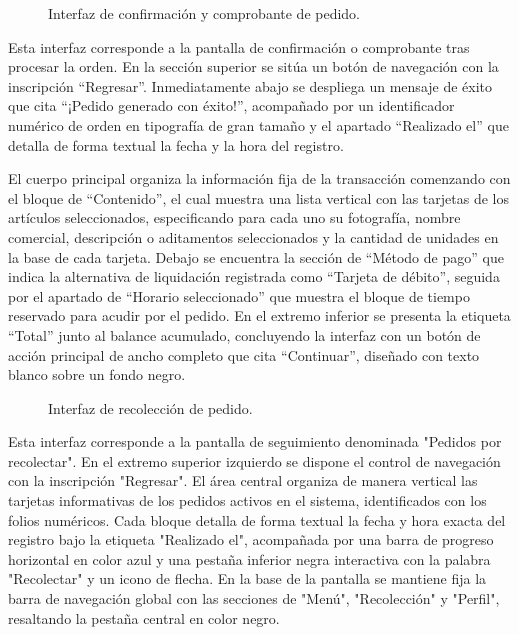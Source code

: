 \begin{figure}[H]
    \centering
    
    \caption{Interfaz de confirmación y comprobante de pedido.}
    \label{fig:ui-cli-12}
\end{figure}

Esta interfaz corresponde a la pantalla de confirmación o comprobante tras procesar la orden. En la sección superior se sitúa un botón de navegación con la inscripción ``Regresar''. Inmediatamente abajo se despliega un mensaje de éxito que cita ``¡Pedido generado con éxito!'', acompañado por un identificador numérico de orden en tipografía de gran tamaño y el apartado ``Realizado el'' que detalla de forma textual la fecha y la hora del registro.

El cuerpo principal organiza la información fija de la transacción comenzando con el bloque de ``Contenido'', el cual muestra una lista vertical con las tarjetas de los artículos seleccionados, especificando para cada uno su fotografía, nombre comercial, descripción o aditamentos seleccionados y la cantidad de unidades en la base de cada tarjeta. Debajo se encuentra la sección de ``Método de pago'' que indica la alternativa de liquidación registrada como ``Tarjeta de débito'', seguida por el apartado de ``Horario seleccionado'' que muestra el bloque de tiempo reservado para acudir por el pedido. En el extremo inferior se presenta la etiqueta ``Total'' junto al balance acumulado, concluyendo la interfaz con un botón de acción principal de ancho completo que cita ``Continuar'', diseñado con texto blanco sobre un fondo negro.

\begin{figure}[H]
    \centering
    
    \caption{Interfaz de recolección de pedido.}
    \label{fig:ui-cli-13}
\end{figure}

Esta interfaz corresponde a la pantalla de seguimiento denominada "Pedidos por recolectar". En el extremo superior izquierdo se dispone el control de navegación con la inscripción "Regresar". El área central organiza de manera vertical las tarjetas informativas de los pedidos activos en el sistema, identificados con los folios numéricos. Cada bloque detalla de forma textual la fecha y hora exacta del registro bajo la etiqueta "Realizado el", acompañada por una barra de progreso horizontal en color azul y una pestaña inferior negra interactiva con la palabra "Recolectar" y un icono de flecha. En la base de la pantalla se mantiene fija la barra de navegación global con las secciones de "Menú", "Recolección" y "Perfil", resaltando la pestaña central en color negro. 

